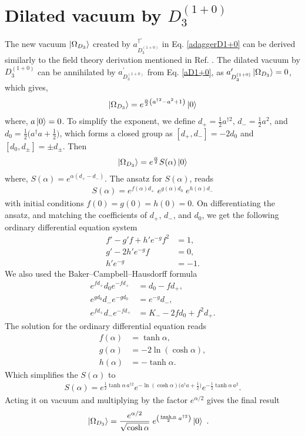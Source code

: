 \documentclass[%
 reprint,
superscriptaddress,
 amsmath,amssymb,
 aps,
]{revtex4-2}
\begin{document}
\section{Dilated vacuum by $D_{3}^{(1+0)}$} 
\label{Dilated-vacuum}
The new vacuum $\ket{\Omega_{D_{3}}}$ created by $a^{\dagger\prime}_{D^{(1+0)}_{3}}$ in Eq. \ref{adaggerD1+0} can be derived similarly to the field theory derivation mentioned in Ref. \cite{umezawa1982thermo}. The dilated vacuum by $D_{3}^{(1+0)}$ can be annihilated by $a^{\prime}_{D^{(1+0)}_{3}}$ from Eq. \ref{aD1+0}, as $ a^{\prime}_{D^{(1+0)}_{3}}\ket{\Omega_{D_{3}}}=0$, which gives, 
\begin{align}
    \ket{\Omega_{D_{3}}}=e^{\frac{\alpha}{2}\left(a^{\dagger 2} - a^2+1\right)}\ket{0}
\end{align}
where, $a\ket{0}=0$. To simplify the exponent, we define $d_{+}=\frac12 a^{\dagger2}$, $d_{-}=\frac12 a^{2}$, and $d_{0}=\frac12\bigl(a^{\dagger}a+\tfrac12\bigr)$, which forms a closed group as $[d_{+},d_{-}]=-2d_{0}$ and $[d_{0},d_{\pm}]=\pm d_{\pm}$. Then
\begin{align}
    \ket{\Omega_{D_{3}}}=e^{\frac{\alpha}{2}}S(\alpha)\ket{0}
\end{align}
where, $S(\alpha)=e^{\alpha(d_{+}-d_{-})}$. The ansatz for $S(\alpha)$, reads
\begin{align}
S(\alpha)=e^{f(\alpha)d_{+}}\;e^{g(\alpha)d_{0}}\;e^{h(\alpha)d_{-}}
\end{align}
with initial conditions $f(0)=g(0)=h(0)=0$. On differentiating the ansatz, and matching the coefficients of $d_{+}$, $d_{-}$, and $d_{0}$, we get the following ordinary differential equation system
\begin{align}
f'-g'f+h'e^{-g}f^{2}&=1,\\
g'-2h'e^{-g}f&=0,\\
h'e^{-g}&=-1.
\end{align}
We also used the Baker–Campbell–Hausdorff formula
\begin{align}
    e^{f d_{+}}d_{0}e^{-f d_{+}}&=d_{0}-f d_{+},\\
e^{g d_{0}}d_{-}e^{-g d_{0}}&=e^{-g}d_{-},\\
e^{f d_{+}}d_{-}e^{-f d_{+}}&=K_{-}-2fd_{0}+f^{2}d_{+}.
\end{align}
The solution for the ordinary differential equation reads 
\begin{align}
    f(\alpha)&=\tanh\alpha,\\
g(\alpha)&=-2\ln(\cosh\alpha),\\
h(\alpha)&=-\tanh\alpha.
\end{align}
Which simplifies the $S(\alpha)$ to 
\begin{align}
    S(\alpha)
   =e^{\tfrac12\tanh\alpha\,a^{\dagger2}} e^{-\ln(\cosh\alpha)\bigl(a^{\dagger}a+\tfrac12\bigr)} e^{-\tfrac12\tanh\alpha\,a^{2}}.
\end{align}
Acting it on vacuum and multiplying by the factor \(e^{\alpha/2}\) gives the final result
\begin{align}
    \ket{\Omega_{D_{3}}}&=\frac{e^{\alpha/2}}{\sqrt{\cosh\alpha}}\;
     e^{\left(\frac{\tanh\alpha}{2}\,a^{\dagger2}\right)}\ket{0}~.
\end{align}
\end{document}
